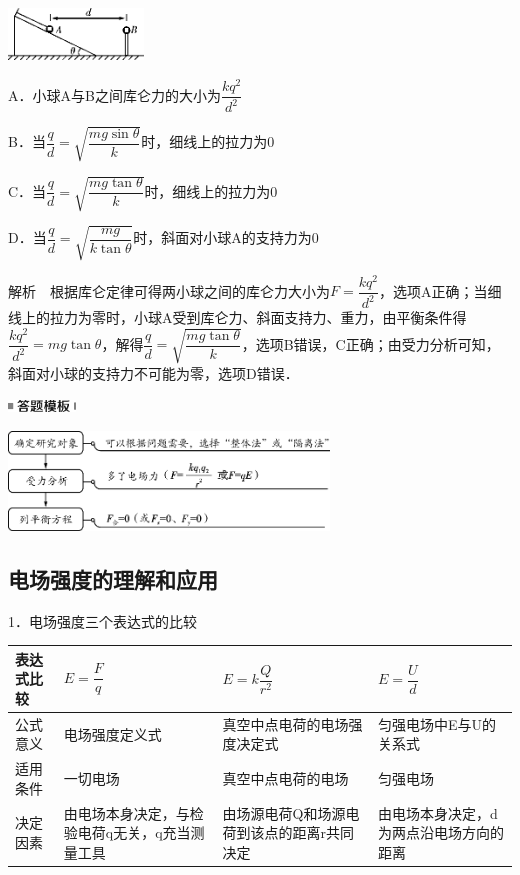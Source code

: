 \documentclass[cn,10.5pt,chinese,mac,chinesefont=founder]{elegantbook}
\begin{document}
\begin{center}\includegraphics[width=1.41667in,height=0.54167in]{media/image261.png}\end{center}

A．小球A与B之间库仑力的大小为$\dfrac{kq^2}{d^2}$

B．当$\dfrac{q}{d}=\sqrt{\dfrac{mg\sin\theta}{k}}$时，细线上的拉力为0

C．当$\dfrac{q}{d}=\sqrt{\dfrac{mg\tan\theta}{k}}$时，细线上的拉力为0

D．当$\dfrac{q}{d}=\sqrt{\dfrac{mg}{k\tan\theta}}$时，斜面对小球A的支持力为0

解析　根据库仑定律可得两小球之间的库仑力大小为$F=\dfrac{kq^2}{d^2}$，选项A正确；当细线上的拉力为零时，小球A受到库仑力、斜面支持力、重力，由平衡条件得$\dfrac{kq^2}{d^2}=mg\tan\theta$，解得$\dfrac{q}{d}=\sqrt{\dfrac{mg\tan\theta}{k}}$，选项B错误，C正确；由受力分析可知，斜面对小球的支持力不可能为零，选项D错误．

\begin{center}\includegraphics[width=0.70833in,height=0.125in]{media/image25.png}\end{center}
\begin{center}\includegraphics[width=3.35417in,height=1.04167in]{media/image262.png}\end{center}
\newpage
\subsection{电场强度的理解和应用}

1．电场强度三个表达式的比较

\begin{longtable}[]{@{}m{2cm}m{4cm}m{4cm}m{3cm}@{}}
\toprule

表达式比较&$E=\dfrac{F}{q}$&$E=k\dfrac{Q}{r^2}$&$E=\dfrac{U}{d}$
\tabularnewline
\midrule
\endhead
公式意义 & 电场强度定义式 & 真空中点电荷的电场强度决定式 &
匀强电场中E与U的关系式\tabularnewline
适用条件 & 一切电场 & 真空中点电荷的电场 & 匀强电场\tabularnewline
决定因素 & 由电场本身决定，与检验电荷q无关，q充当测量工具 &
由场源电荷Q和场源电荷到该点的距离r共同决定 &
由电场本身决定，d为两点沿电场方向的距离\tabularnewline
\bottomrule
\end{longtable}
\end{document}
